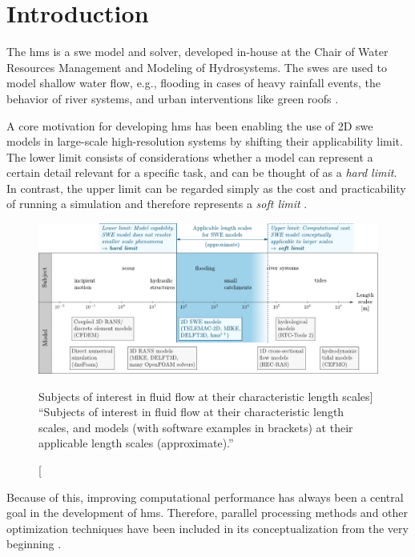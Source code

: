 \section{Introduction}\label{sec:intro}

The \gls{hms} is a \acrlong{swe} model and solver, developed in-house at the Chair of Water Resources Management and Modeling of Hydrosystems.
The \glspl{swe} are used to model shallow water flow, e.g., flooding in cases of heavy rainfall events, the behavior of river systems, and urban interventions like green roofs \autocite{fischer2024,sanders2008}.

A core motivation for developing \gls{hms} has been enabling the use of \acrlong*{2D} \gls{swe} models in large-scale high-resolution systems by shifting their applicability limit.
The lower limit consists of considerations whether a model can represent a certain detail relevant for a specific task, and can be thought of as a \emph{hard limit}.
In contrast, the upper limit can be regarded simply as the cost and practicability of running a simulation and therefore represents a \emph{soft limit} \autocite{lennart-hms}.

\begin{figure}[htbp]
	\centering
	\includegraphics[width=\textwidth]{./img/length_scales_rev.pdf}
	\caption
    [Subjects of interest in fluid flow at their characteristic length scales]
    {
		``Subjects of interest in fluid flow at their characteristic length scales, and models (with software examples in brackets) at their applicable length scales (approximate).''
		\autocite{lennart-hms}
	}
\end{figure}

Because of this, improving computational performance has always been a central goal in the development of \gls{hms}.
Therefore, parallel processing methods and other optimization techniques have been included in its conceptualization from the very beginning \autocite{steffen2020}.

